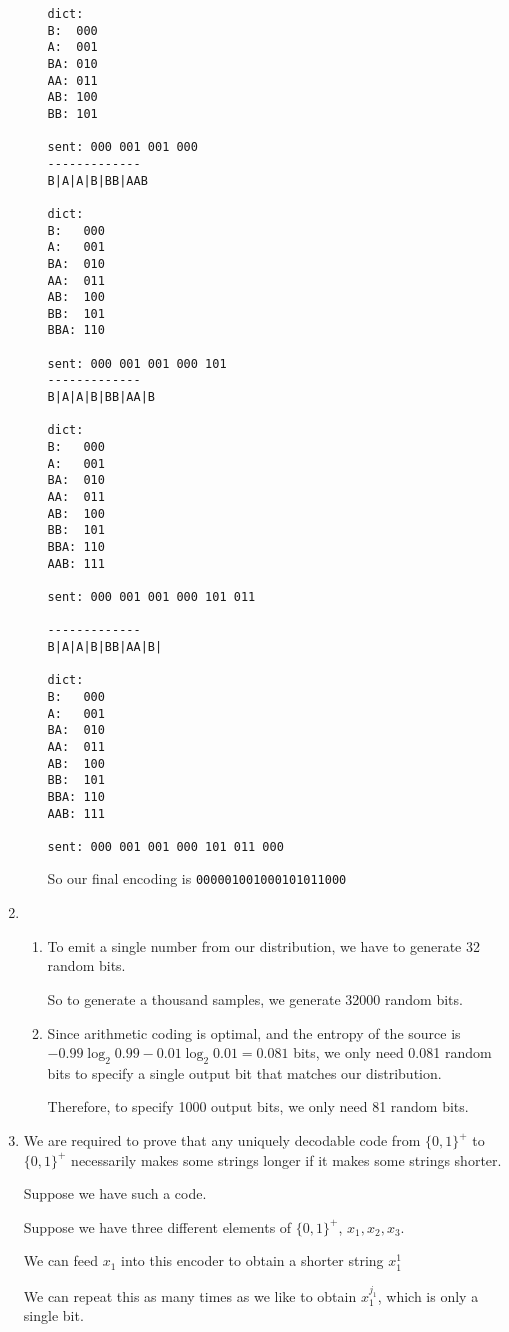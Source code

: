 \begin{enumerate}
\begin{enumerate}
\begin{verbatim}
dict:
B:  000
A:  001
BA: 010
AA: 011
AB: 100
BB: 101

sent: 000 001 001 000
-------------
B|A|A|B|BB|AAB

dict:
B:   000
A:   001
BA:  010
AA:  011
AB:  100
BB:  101
BBA: 110

sent: 000 001 001 000 101
-------------
B|A|A|B|BB|AA|B

dict:
B:   000
A:   001
BA:  010
AA:  011
AB:  100
BB:  101
BBA: 110
AAB: 111

sent: 000 001 001 000 101 011

-------------
B|A|A|B|BB|AA|B|

dict:
B:   000
A:   001
BA:  010
AA:  011
AB:  100
BB:  101
BBA: 110
AAB: 111

sent: 000 001 001 000 101 011 000
\end{verbatim}

So our final encoding is \texttt{000001001000101011000}
\end{enumerate}

\item
  \begin{enumerate}
      \item
        To emit a single number from our distribution, we have to generate 32 random bits.

        So to generate a thousand samples, we generate 32000 random bits.

        \item
          Since arithmetic coding is optimal, and the entropy of the source is $-0.99\log_2 0.99 - 0.01 \log_2 0.01 = 0.081$ bits, we only need 0.081 random bits to specify a single output bit that matches our distribution.

          Therefore, to specify 1000 output bits, we only need 81 random bits.
  \end{enumerate}

  \item
    We are required to prove that any uniquely decodable code from $\{0,1\}^+$ to $\{0,1\}^+$ necessarily makes some strings longer if it makes some strings shorter.

    Suppose we have such a code.

    Suppose we have three different elements of $\{0,1\}^+$, $x_1, x_2, x_3$.

    We can feed $x_1$ into this encoder to obtain a shorter string $x_1^1$

    We can repeat this as many times as we like to obtain $x_1^{j_1}$, which is only a single bit.


\end{enumerate}
